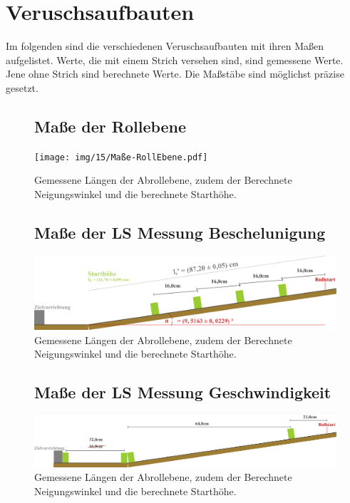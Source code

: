 \onecolumn
\chapter{Veruschsaufbauten}
Im folgenden sind die verschiedenen Veruschsaufbauten mit ihren Maßen aufgelistet. Werte, die mit einem Strich versehen sind, sind gemessene Werte. Jene ohne Strich sind berechnete Werte. Die Maßstäbe sind möglichst präzise gesetzt.

\begin{figure}[!ht]
    \section{Maße der Rollebene}
    \centering
    \texttt{[image: img/15/Maße-RollEbene.pdf]}
    \caption{Gemessene Längen der Abrollebene, zudem der Berechnete Neigungswinkel und die berechnete Starthöhe.}
    \label{fig:maße_re}
\end{figure}

\begin{figure}[!ht]
    \section{Maße der LS Messung Beschelunigung}
    \centering
    \includegraphics[width=1\textwidth]{img/15/Aufbau2.pdf}
    \caption{Gemessene Längen der Abrollebene, zudem der Berechnete Neigungswinkel und die berechnete Starthöhe.}
    \label{fig:maße_2}
\end{figure}

\begin{figure}[!ht]
    \section{Maße der LS Messung Geschwindigkeit}
    \centering
    \includegraphics[width=1\textwidth]{img/15/Aufbau3.pdf}
    \caption{Gemessene Längen der Abrollebene, zudem der Berechnete Neigungswinkel und die berechnete Starthöhe.}
    \label{fig:maße_3}
\end{figure}

